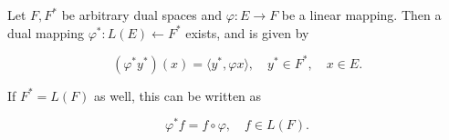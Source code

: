 Let $F, F^*$ be arbitrary dual spaces and $\varphi: E \rightarrow F$ be a linear mapping. Then a dual mapping $\varphi^*: L(E) \leftarrow F^*$ exists, and is given by

$$(\varphi^* y^*)(x) = \langle y^*, \varphi x \rangle, \quad y^* \in F^*, \quad x \in E.$$

If $F^* = L(F)$ as well, this can be written as

$$\varphi^* f = f \circ \varphi, \quad f \in L(F).$$
